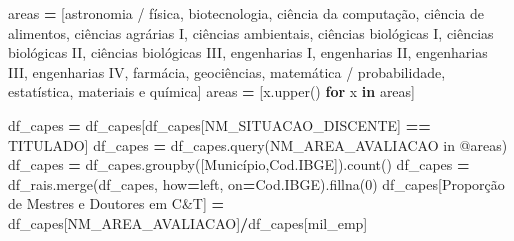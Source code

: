 \documentclass[
  12,
  dvipsnames]{article}
\newenvironment{Shaded}{\begin{snugshade}}{\end{snugshade}}
\newcommand{\ControlFlowTok}[1]{\textcolor[rgb]{0.13,0.29,0.53}{\textbf{#1}}}
\newcommand{\DecValTok}[1]{\textcolor[rgb]{0.00,0.00,0.81}{#1}}
\newcommand{\KeywordTok}[1]{\textcolor[rgb]{0.13,0.29,0.53}{\textbf{#1}}}
\newcommand{\NormalTok}[1]{#1}
\newcommand{\OperatorTok}[1]{\textcolor[rgb]{0.81,0.36,0.00}{\textbf{#1}}}
\newcommand{\StringTok}[1]{\textcolor[rgb]{0.31,0.60,0.02}{#1}}
\begin{document}
\begin{Shaded}
\begin{Highlighting}[]
\NormalTok{areas }\OperatorTok{=}\NormalTok{ [}\StringTok{\textquotesingle{}astronomia / física\textquotesingle{}}\NormalTok{, }\StringTok{\textquotesingle{}biotecnologia\textquotesingle{}}\NormalTok{, }\StringTok{\textquotesingle{}ciência da computação\textquotesingle{}}\NormalTok{, }
         \StringTok{\textquotesingle{}ciência de alimentos\textquotesingle{}}\NormalTok{, }\StringTok{\textquotesingle{}ciências agrárias I\textquotesingle{}}\NormalTok{, }\StringTok{\textquotesingle{}ciências ambientais\textquotesingle{}}\NormalTok{, }
         \StringTok{\textquotesingle{}ciências biológicas I\textquotesingle{}}\NormalTok{, }\StringTok{\textquotesingle{}ciências biológicas II\textquotesingle{}}\NormalTok{, }\StringTok{\textquotesingle{}ciências biológicas III\textquotesingle{}}\NormalTok{, }
         \StringTok{\textquotesingle{}engenharias I\textquotesingle{}}\NormalTok{, }\StringTok{\textquotesingle{}engenharias II\textquotesingle{}}\NormalTok{, }\StringTok{\textquotesingle{}engenharias III\textquotesingle{}}\NormalTok{, }\StringTok{\textquotesingle{}engenharias IV\textquotesingle{}}\NormalTok{, }
         \StringTok{\textquotesingle{}farmácia\textquotesingle{}}\NormalTok{, }\StringTok{\textquotesingle{}geociências\textquotesingle{}}\NormalTok{, }\StringTok{\textquotesingle{}matemática / probabilidade\textquotesingle{}}\NormalTok{, }\StringTok{\textquotesingle{}estatística\textquotesingle{}}\NormalTok{, }
         \StringTok{\textquotesingle{}materiais e química\textquotesingle{}}\NormalTok{]}
\NormalTok{areas }\OperatorTok{=}\NormalTok{ [x.upper() }\ControlFlowTok{for}\NormalTok{ x }\KeywordTok{in}\NormalTok{ areas]}

\NormalTok{df\_capes }\OperatorTok{=}\NormalTok{ df\_capes[df\_capes[}\StringTok{\textquotesingle{}NM\_SITUACAO\_DISCENTE\textquotesingle{}}\NormalTok{] }\OperatorTok{==} \StringTok{\textquotesingle{}TITULADO\textquotesingle{}}\NormalTok{]}
\NormalTok{df\_capes }\OperatorTok{=}\NormalTok{ df\_capes.query(}\StringTok{\textquotesingle{}NM\_AREA\_AVALIACAO in @areas\textquotesingle{}}\NormalTok{)}
\NormalTok{df\_capes }\OperatorTok{=}\NormalTok{ df\_capes.groupby([}\StringTok{\textquotesingle{}Município\textquotesingle{}}\NormalTok{,}\StringTok{\textquotesingle{}Cod.IBGE\textquotesingle{}}\NormalTok{]).count()}
\NormalTok{df\_capes }\OperatorTok{=}\NormalTok{ df\_rais.merge(df\_capes, how}\OperatorTok{=}\StringTok{\textquotesingle{}left\textquotesingle{}}\NormalTok{, on}\OperatorTok{=}\StringTok{\textquotesingle{}Cod.IBGE\textquotesingle{}}\NormalTok{).fillna(}\DecValTok{0}\NormalTok{)}
\NormalTok{df\_capes[}\StringTok{\textquotesingle{}Proporção de Mestres e Doutores em C\&T\textquotesingle{}}\NormalTok{] }\OperatorTok{=}\NormalTok{ df\_capes[}\StringTok{\textquotesingle{}NM\_AREA\_AVALIACAO\textquotesingle{}}\NormalTok{]}\OperatorTok{/}\NormalTok{df\_capes[}\StringTok{\textquotesingle{}mil\_emp\textquotesingle{}}\NormalTok{]}


\end{Highlighting}
\end{Shaded}
\end{document}
